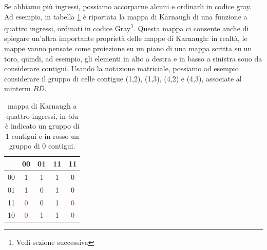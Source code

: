 \documentclass[a4paper, 11pt]{article}
\begin{document}
Se abbiamo più ingressi, possiamo accorparne alcuni e ordinarli in codice gray. Ad esempio, in tabella \ref{tab:karnaugh2} è riportata la mappa di Karnaugh di una funzione a quattro ingressi, ordinati in codice Gray\footnote{Vedi sezione successiva}. Questa mappa ci consente anche di spiegare un'altra importante proprietà delle mappe di Karnaugh: in realtà, le mappe vanno pensate come proiezione su un piano di una mappa scritta su un toro, quindi, ad esempio, gli elementi in alto a destra e in basso a sinistra sono da considerare contigui. Usando la notazione matriciale, possiamo ad esempio considerare il gruppo di celle contigue (1,2), (1,3), (4,2) e (4,3), associate al minterm $B\overline{D}$.
\begin{table}[h!]
	\centering
	\begin{tabular}{c| c c c c}
		\backslashbox{$CD$}{$AB$}&00&01&11&11\\\hline00&1&\textcolor{blue}{1}&\textcolor{blue}{1}&0\\01&1&0&1&0\\11&\textcolor{red}{0}&0&1&\textcolor{red}{0}\\10&\textcolor{red}{0}&\textcolor{blue}{1}&\textcolor{blue}{1}&\textcolor{red}{0}
	\end{tabular}
	\caption{mappa di Karnaugh a quattro ingressi, in blu è indicato un gruppo di 1 contigui e in rosso un gruppo di 0 contigui.}
	\label{tab:karnaugh2}
\end{table}
\end{document}
